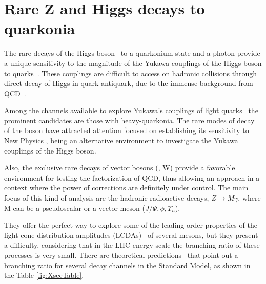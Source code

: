 
\section{Rare Z and Higgs decays to quarkonia}
\label{section_rare_deays}

The rare decays of the Higgs boson~\cite{higgs_discovery_atlas,higgs_discovery_cms} to a quarkonium state and a photon provide a unique sensitivity to the magnitude of the Yukawa couplings of the Higgs boson to quarks~\cite{PhysRevD.88.053003, PhysRevD.90.113010,PhysRevLett.114.191803}. These couplings are difficult to access on hadronic collisions through direct decay of Higgs in quark-antiquark, due to the immense background from QCD~\cite{PhysRevD.89.033014}. 

Among the channels available to explore Yukawa's couplings of light quarks~\cite{PhysRevD.90.113010,PhysRevLett.114.191803} the prominent candidates are those with heavy-quarkonia. The rare modes of decay of the \Z boson have attracted attention focused on establishing its sensitivity to New Physics \cite{PEREZ}, being an alternative environment to investigate the Yukawa couplings of the Higgs boson.


Also, the exclusive rare decays of vector bosons (\Z, W) provide a favorable environment for testing the factorization of QCD, thus allowing an approach in a context where the power of corrections are definitely under control. The main focus of this kind of analysis are the hadronic radioactive decays, $Z\rightarrow M \gamma$, where M can be a pseudoscalar or a vector meson ($J/ \Psi, \phi, \Upsilon_{n}$). 

They offer the perfect way to explore some of the leading order properties of the light-cone distribution amplitudes (LCDAs)~\cite{Grossman2015} of several mesons, but they present a difficulty, considering that in the LHC energy scale the branching ratio of these processes is very small. There are theoretical predictions~\cite{PhysRevD.97.016009,PhysRevD.96.116014} that point out a branching ratio for several decay channels in the Standard Model, as shown in the Table \ref{fig:XsecTable}.

